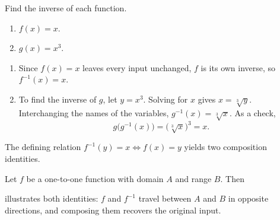 \begin{workedexample}
\begin{example}
Find the inverse of each function.
\begin{enumerate}
    \item \(f(x) = x\).
    \item \(g(x) = x^{3}\).
\end{enumerate}
\end{example}

\begin{solution}
\solutionbreak
\begin{enumerate}
    \item Since \(f(x) = x\) leaves every input unchanged, \(f\) is its own inverse, so \(f^{-1}(x) = x\).

    \item To find the inverse of \(g\), let \(y = x^{3}\). Solving for \(x\) gives \(x = \sqrt[3]{y}\). Interchanging the names of the variables, \(g^{-1}(x) = \sqrt[3]{x}\). As a check,
    \[
    g\!\bigl(g^{-1}(x)\bigr) = \bigl(\sqrt[3]{x}\bigr)^{3} = x.
    \]
\end{enumerate}
\end{solution}
\end{workedexample}

The defining relation \(f^{-1}(y) = x \Longleftrightarrow f(x) = y\) yields two composition identities.

\begin{proposition}
Let \(f\) be a one-to-one function with domain \(A\) and range \(B\). Then
\end{proposition}

 illustrates both identities: \(f\) and \(f^{-1}\) travel between \(A\) and \(B\) in opposite directions, and composing them recovers the original input.

